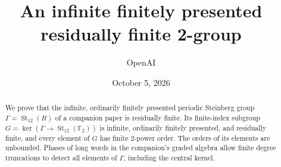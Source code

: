 \documentclass[11pt]{article}
\title{An infinite finitely presented residually finite 2-group}
\author{OpenAI}
\date{October 5, 2026}
\numberwithin{equation}{section}
\theoremstyle{definition}
\theoremstyle{remark}
\newcommand{\F}{\mathbb F}
\DeclareMathOperator{\St}{St}
\begin{document}
\maketitle
\begin{abstract}
We prove that the infinite, ordinarily finitely presented periodic
Steinberg group $\Gamma=\St_{12}(R)$ of a companion paper is residually
finite. Its finite-index subgroup
$G=\ker(\Gamma\to\St_{12}(\F_2))$ is infinite, ordinarily finitely
presented, and residually finite, and every element of $G$ has finite
$2$-power order. The orders of its elements are unbounded.
Phases of long words in the companion's graded algebra allow finite
degree truncations to detect all elements of $\Gamma$, including the
central kernel.
\end{abstract}








\begingroup\raggedright

\endgroup
\end{document}
